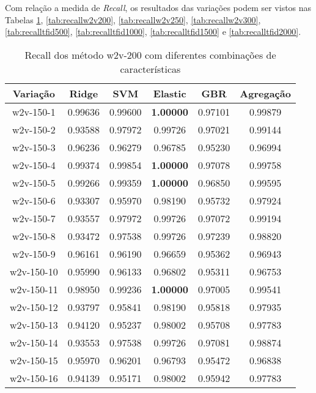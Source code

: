  Com relação a medida de \textit{Recall}, os resultados das variações podem ser vistos nas Tabelas \ref{tab:recallw2v150}, \ref{tab:recallw2v200}, \ref{tab:recallw2v250}, \ref{tab:recallw2v300}, \ref{tab:recalltfid500}, \ref{tab:recalltfid1000}, \ref{tab:recalltfid1500} e \ref{tab:recalltfid2000}.

\begin{table}[H]
\centering
\begin{tabular}{|c| c c  c  c  c| }
\hline
Variação &  Ridge & SVM & Elastic & GBR & Agregação  \\ 
\hline
w2v-150-1 & 0.99636 & 0.99600 & \textbf{1.00000} & 0.97101 & 0.99879 \\
\hline
w2v-150-2 & 0.93588 & 0.97972 & 0.99726 & 0.97021 & 0.99144 \\
\hline
w2v-150-3 & 0.96236 & 0.96279 & 0.96785 & 0.95230 & 0.96994 \\
\hline
w2v-150-4 & 0.99374 & 0.99854 & \textbf{1.00000} & 0.97078 & 0.99758 \\
\hline
w2v-150-5 & 0.99266 & 0.99359 & \textbf{1.00000} & 0.96850 & 0.99595 \\
\hline
w2v-150-6 & 0.93307 & 0.95970 & 0.98190 & 0.95732 & 0.97924 \\
\hline
w2v-150-7 & 0.93557 & 0.97972 & 0.99726 & 0.97072 & 0.99194 \\
\hline
w2v-150-8 & 0.93472 & 0.97538 & 0.99726 & 0.97239 & 0.98820 \\
\hline
w2v-150-9 & 0.96161 & 0.96190 & 0.96659 & 0.95362 & 0.96943 \\
\hline
w2v-150-10 & 0.95990 & 0.96133 & 0.96802 & 0.95311 & 0.96753 \\
\hline
w2v-150-11 & 0.98950 & 0.99236 & \textbf{1.00000} & 0.97005 & 0.99541 \\
\hline
w2v-150-12 & 0.93797 & 0.95841 & 0.98190 & 0.95818 & 0.97935 \\
\hline
w2v-150-13 & 0.94120 & 0.95237 & 0.98002 & 0.95708 & 0.97783 \\
\hline
w2v-150-14 & 0.93553 & 0.97538 & 0.99726 & 0.97081 & 0.98874 \\
\hline
w2v-150-15 & 0.95970 & 0.96201 & 0.96793 & 0.95472 & 0.96838 \\
\hline
w2v-150-16 & 0.94139 & 0.95171 & 0.98002 & 0.95942 & 0.97783 \\
\hline
\end{tabular}
\caption{Recall dos método w2v-200 com diferentes combinações de características}
\label{tab:recallw2v150}
\end{table}

